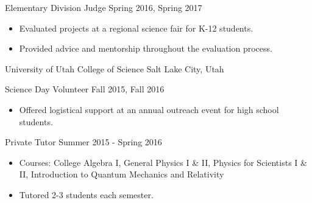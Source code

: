 \begin{tab2} Elementary Division Judge \> Spring 2016, Spring 2017 \end{tab2}
\begin{itemize}
    \item Evaluated projects at a regional science fair for K-12 students.
    \item Provided advice and mentorship throughout the evaluation process.
\end{itemize}

\blockskip

\begin{tab1} University of Utah College of Science \> Salt Lake City, Utah \end{tab1}

\begin{tab2} Science Day Volunteer \> Fall 2015, Fall 2016 \end{tab2}
\begin{itemize}
    \item Offered logistical support at an annual outreach event for high school students.
\end{itemize}

\begin{tab2} Private Tutor \> Summer 2015 - Spring 2016 \end{tab2}
\begin{itemize}
    \item Courses: College Algebra I, General Physics I \& II, Physics for Scientists I \& II, Introduction to Quantum Mechanics and Relativity
    \item Tutored 2-3 students each semester.
\end{itemize}

